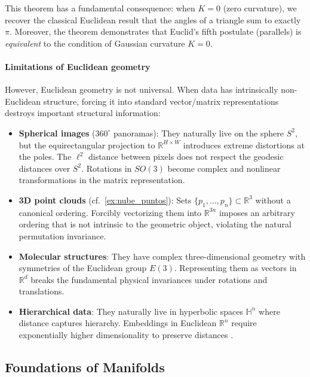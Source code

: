 This theorem \citep{lee2018introduction} has a fundamental consequence: when $K = 0$ (zero curvature), we recover the classical Euclidean result that the angles of a triangle sum to exactly $\pi$. Moreover, the theorem demonstrates that Euclid's fifth postulate (parallels) is \textit{equivalent} to the condition of Gaussian curvature $K = 0$.

\paragraph{Limitations of Euclidean geometry}

However, Euclidean geometry is not universal. When data has intrinsically non-Euclidean structure, forcing it into standard vector/matrix representations destroys important structural information:

\begin{itemize}
    \item \textbf{Spherical images} ($360^\circ$ panoramas): They naturally live on the sphere $S^2$, but the equirectangular projection to $\mathbb{R}^{H \times W}$ introduces extreme distortions at the poles. The $\ell^2$ distance between pixels does not respect the geodesic distances over $S^2$. Rotations in $SO(3)$ become complex and nonlinear transformations in the matrix representation.

    \item \textbf{3D point clouds} (cf.~\autoref{ex:nube_puntos}): Sets $\{p_1, \ldots, p_n\} \subset \mathbb{R}^3$ without a canonical ordering. Forcibly vectorizing them into $\mathbb{R}^{3n}$ imposes an arbitrary ordering that is not intrinsic to the geometric object, violating the natural permutation invariance.

    \item \textbf{Molecular structures}: They have complex three-dimensional geometry with symmetries of the Euclidean group $E(3)$. Representing them as vectors in $\mathbb{R}^d$ breaks the fundamental physical invariances under rotations and translations.

    \item \textbf{Hierarchical data}: They naturally live in hyperbolic spaces $\mathbb{H}^n$ where distance captures hierarchy. Embeddings in Euclidean $\mathbb{R}^n$ require exponentially higher dimensionality to preserve distances \citep{nickel2017poincare}.
\end{itemize}

\subsection{Foundations of Manifolds}\label{subsec:fundamentos_variedades}

